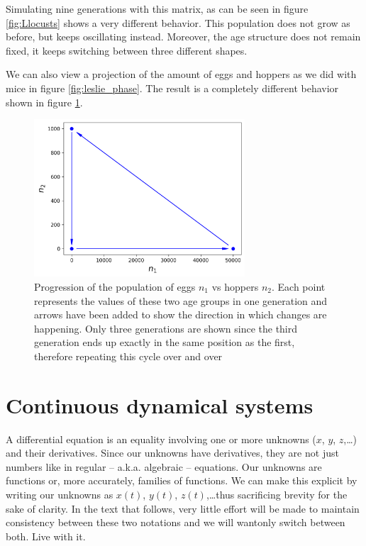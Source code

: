 \documentclass[12pt]{article}
\begin{document}
Simulating nine generations with this matrix, as can be seen in figure \ref{fig:Llocusts} shows a very different behavior. This population does not grow as before, but keeps oscillating instead. Moreover, the age structure does not remain fixed, it keeps switching between three different shapes.

We can also view a projection of the amount of eggs and hoppers as we did with mice in figure \ref{fig:leslie_phase}. The result is a completely different behavior shown in figure \ref{fig:leslie_locust_phase}.


\begin{figure}
	\begin{center}
		\includegraphics[width=0.7\textwidth]{locusts_phaseI}	
	\end{center}
	\caption{Progression of the population of eggs $n_1$ vs hoppers $n_2$. Each point represents the values of these two age groups in one generation and arrows have been added to show the direction in which changes are happening. Only three generations are shown since the third generation ends up exactly in the same position as the first, therefore repeating this cycle over and over }
	\label{fig:leslie_locust_phase}
\end{figure}


\FloatBarrier


\section{Continuous dynamical systems}

A differential equation is an equality involving one or more unknowns ($x$, $y$, $z$,\dots) and their derivatives. Since our unknowns have derivatives, they are not just numbers like in regular -- a.k.a. algebraic -- equations. Our unknowns are functions or, more accurately, families of functions. We can make this explicit by writing our unknowns as $x(t)$, $y(t)$, $z(t)$,\dots thus sacrificing brevity for the sake of clarity. In the text that follows, very little effort will be made to maintain consistency between these two notations and we will wantonly switch between both. Live with it.
\end{document}
